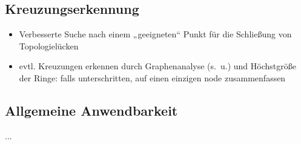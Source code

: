 \documentclass[../main/thesis.tex]{subfiles}
\begin{document}




\subsection{Kreuzungserkennung}
\begin{itemize}
\item Verbesserte Suche nach einem „geeigneten“ Punkt für die Schließung von Topologielücken
\item evtl. Kreuzungen erkennen durch Graphenanalyse (s.~u.) und Höchstgröße der Ringe: falls unterschritten, auf einen einzigen node zusammenfassen
\end{itemize}



\subsection{Allgemeine Anwendbarkeit}
...
\end{document}
